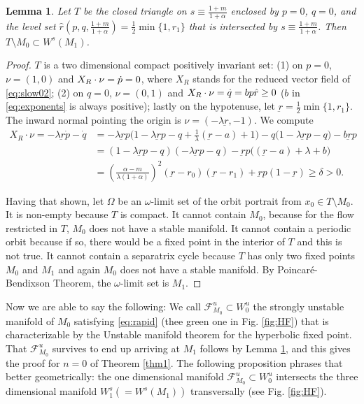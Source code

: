 \documentclass[a4paper,11pt]{article}
\newtheorem{lemma}{Lemma}[section]
\theoremstyle{remark}
\begin{document}
\begin{lemma} \label{lem:T}
 Let $T$ be the closed triangle on $s\equiv \frac{1+m}{1+\alpha}$ enclosed by $p=0$, $q=0$, and the level set $\hat{r}(p,q,\frac{1+m}{1+\alpha})= \frac{1}{2}\min\{1,r_1\}$ that is intersected by $s\equiv \frac{1+m}{1+\alpha}$. 
 Then $T\setminus M_0 \subset W^s(M_1)$.
\end{lemma}
\begin{proof}
$T$ is a two dimensional compact positively invariant set: (1) on $p=0$, $\nu = (1,0)$ and $X_R\cdot\nobreak\nu = \dot{p}=0$, where $X_R$ stands for the reduced vector field of \eqref{eq:slow02};
 (2) on $q=0$, $\nu = (0,1)$ and $X_R\cdot\nobreak\nu=\dot{q} = bp\hat{r}\ge0$ ($b$ in \eqref{eq:exponents} is always positive); lastly on the hypotenuse, let $\underbar{r}=\frac{1}{2}\min\{1,r_1\}$. The inward normal pointing the origin is $\nu = (-\lambda\underbar{r}, -1)$. We compute
  \begin{align}
  X_R\cdot\nu=-\lambda\underbar{r}\dot{p} -\dot{q}&= -\lambda \underbar{r}p \Big(1-\lambda \underbar{r}p -q + \frac{1}{\lambda}(\underbar{r}-a)+1\Big) - q(1-\lambda \underbar{r}p -q\big) - b \underbar{r}p \nonumber\\
  &= (1-\lambda \underbar{r}p -q)(-\lambda \underbar{r}p -q) -\underbar{r}p\Big((\underbar{r}-a)+\lambda+b\Big)\nonumber\\
  &= \left(\frac{\alpha-m}{\lambda(1+\alpha)}\right)^2(\underbar{r}-r_0)(\underbar{r}-r_1)+\underbar{r}p(1-\underbar{r})\ge \delta>0. \label{eq:affine}
 \end{align}

Having that shown, let $\Omega$ be an $\omega$-limit set of the orbit portrait from $x_0\in T\setminus M_0$. It is non-empty because $T$ is compact. It cannot contain $M_0$, because for the flow restricted in $T$, $M_0$ does not have a stable manifold. It cannot contain a periodic orbit because if so, there would be a fixed point in the interior of $T$ and this is not true. 
It cannot contain a separatrix cycle because $T$ has only two fixed points $M_0$ and $M_1$ and again $M_0$ does not have a stable manifold.  By Poincar\'e-Bendixson Theorem, the $\omega$-limit set is $M_1$.
\end{proof}


Now we are able to say the following: We call $\mathcal{F}^u_{M_0}\subset W^u_0$ the strongly unstable manifold of $M_0$ satisfying \eqref{eq:rapid} (thee green one in Fig. \ref{fig:HF}) that is characterizable by the Unstable manifold theorem for the hyperbolic fixed point. That $\mathcal{F}^u_{M_0}$ survives to end up arriving at $M_1$ follows by Lemma \ref{lem:T}, and this gives the proof for $n=0$ of Theorem \ref{thm1}. The following proposition phrases that better geometrically: the one dimensional manifold $\mathcal{F}^u_{M_0}\subset W^u_0$ intersects the three dimensional manifold $W_1^s(=W^s(M_1))$ transversally (see Fig. \ref{fig:HF}).
\end{document}
